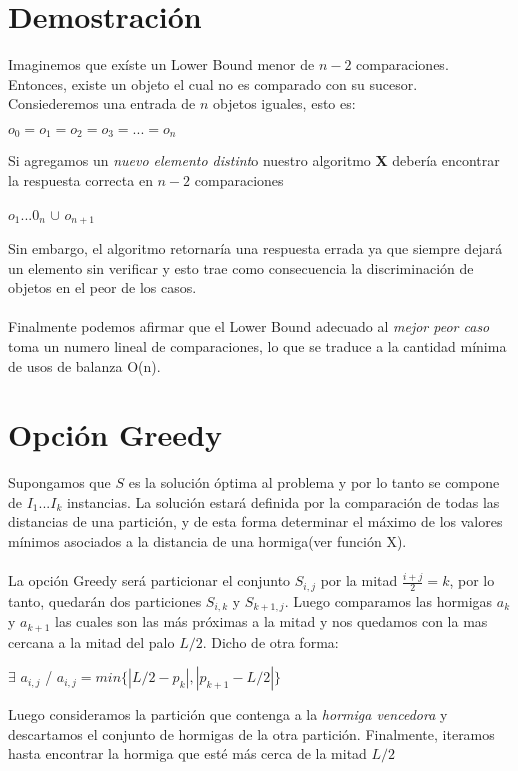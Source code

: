 \documentclass[11pt]{article}
\begin{document}
\section{Demostración}
Imaginemos que exíste un Lower Bound menor de $n-2$ comparaciones. Entonces, existe un objeto el cual no es comparado con su sucesor.\\Consiederemos una entrada de $n$ objetos iguales, esto es: 
\begin{center}$o_0 = o_1 = o_2 = o_3 = ... = o_n$\end{center}
Si agregamos un \emph{nuevo elemento distint}o nuestro algoritmo \textbf{X }debería encontrar la respuesta correcta en $n-2$ comparaciones\\
\begin{center}$o_1...0_n$ $\cup$ $o_{n+1}$\end{center}
Sin embargo, el algoritmo retornaría una respuesta errada ya que siempre dejará un elemento sin verificar y esto trae como consecuencia la discriminación de objetos en el peor de los casos.\\\\Finalmente podemos afirmar que el Lower Bound adecuado al \emph{mejor peor caso} toma un numero lineal de comparaciones, lo que se traduce a la cantidad mínima de usos de balanza O(n).

\section{Opción Greedy}
Supongamos que $S$ es la solución óptima al problema y por lo tanto se compone de $I_1$...$I_k$ instancias. La solución estará definida por la comparación de todas las distancias de una partición, y de esta forma determinar el máximo de los valores mínimos asociados a la distancia de una hormiga(ver función X).\\\\La opción Greedy será particionar el conjunto $S_{i,j}$ por la mitad $\frac{i+j}{2} = k$, por lo tanto, quedarán dos particiones $S_{i,k}$ y $S_{k+1,j}$. Luego comparamos las hormigas $a_k$ y $a_{k+1}$ las cuales son las más próximas a la mitad y nos quedamos con la mas cercana a la mitad del palo $L/2$. Dicho de otra forma:

\begin{center}$\exists$ $a_{i,j}$ / $a_{i,j} = min\{|L/2-p_k|,|p_{k+1}-L/2|\}$\end{center}
Luego consideramos la partición que contenga a la \emph{hormiga vencedora} y descartamos el conjunto de hormigas de la otra partición. Finalmente, iteramos hasta encontrar la hormiga que esté más cerca de la mitad $L/2$
\end{document}
